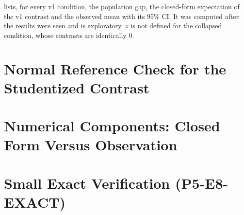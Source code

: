 \documentclass{article}
\theoremstyle{plain}
\theoremstyle{definition}
\theoremstyle{remark}
\newcommand{\E}{\mathbb{E}}
\begin{document}
 lists, for every v1 condition, the population gap, the closed-form expectation of the v1 contrast and the observed mean with its 95\% CI. It was computed after the results were seen and is exploratory. $z$ is not defined for the collapsed condition, whose contrasts are identically $0$.
\begin{table}[h]
\centering
\caption{Closed-form expectation versus observation, all v1 cells (values $\times10^3$).}
\label{tab:reanalysis}
\scriptsize

\end{table}

\section{Normal Reference Check for the Studentized Contrast}
\label{app:znull}
\begin{table}[h]
\centering
\caption{Sign-flip distribution of the studentized mean of $d_i$ given the observed $|d_i|$ (4999 flips) for the seven v1 null cells.}
\label{tab:znull}
\small

\end{table}

\section{Numerical Components: Closed Form Versus Observation}
\label{app:numerics}
\begin{table}[h]
\centering
\caption{Numerical components with exact scores ($N=100$, $M=256$, Test~S). $D_{\mathrm{pop}}$ is the closed-form population gap between the direct and sequential sampler laws, and $\E[d]$ is the closed-form expectation of the v1 contrast. All values $\times10^3$, standardized.}
\label{tab:numerics}
\scriptsize
\setlength{\tabcolsep}{3pt}

\end{table}

\section{Small Exact Verification (P5-E8-EXACT)}
\label{app:e8}
\begin{table}[h]
\centering
\caption{P5-E8-EXACT, Test~P with exact enumeration of the product permutation group ($N=3$ examples, $M=3$, $|G|=20^3$), nominal $\alpha=0.05$, one-sided 95\% Clopper--Pearson bounds on the rejection rate over independent datasets. ``Excess flagged'' means the lower bound exceeds $\alpha$; ``powered'' means the lower bound exceeds $\alpha$ under an alternative. Two negative-control rules are evaluated with the same criteria.}
\label{tab:e8}
\scriptsize
\setlength{\tabcolsep}{2.5pt}

\end{table}
\end{document}
